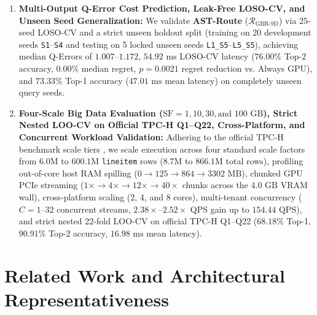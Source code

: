 \documentclass[10pt,a4paper]{article}
\begin{document}
\begin{enumerate}[leftmargin=1.5em,itemsep=2pt]
    \item \textbf{Multi-Output Q-Error Cost Prediction, Leak-Free LOSO-CV, and Unseen Seed Generalization:} We validate \textbf{AST-Route} ($\mathcal{R}_{\text{GBR-9D}}$) via 25-seed LOSO-CV and a strict unseen holdout split (training on 20 development seeds \texttt{S1}--\texttt{S4} and testing on 5 locked unseen seeds \texttt{L1\_S5}--\texttt{L5\_S5}), achieving median Q-Errors of $1.007\text{--}1.172$, $54.92\text{ ms}$ LOSO-CV latency ($76.00\%$ Top-2 accuracy, $0.00\%$ median regret, $p=0.0021$ regret reduction vs. Always GPU), and $73.33\%$ Top-1 accuracy ($47.01\text{ ms}$ mean latency) on completely unseen query seeds.
    \item \textbf{Four-Scale Big Data Evaluation ($\text{SF}=1, 10, 30, \text{and } 100\text{ GB}$), Strict Nested LOO-CV on Official TPC-H Q1--Q22, Cross-Platform, and Concurrent Workload Validation:} Adhering to the official TPC-H benchmark scale tiers \cite{tpc2022tpch,dreseler2020quantifying}, we scale execution across four standard scale factors from $6.0\text{M}$ to $600.1\text{M}$ \texttt{lineitem} rows ($8.7\text{M}$ to $866.1\text{M}$ total rows), profiling out-of-core host RAM spilling ($0 \rightarrow 125 \rightarrow 864 \rightarrow 3302\text{ MB}$), chunked GPU PCIe streaming ($1\times \rightarrow 4\times \rightarrow 12\times \rightarrow 40\times$ chunks across the $4.0\text{ GB}$ VRAM wall), cross-platform scaling (2, 4, and 8 cores), multi-tenant concurrency ($C=1\text{--}32$ concurrent streams, $2.38\times\text{--}2.52\times$ QPS gain up to $154.44\text{ QPS}$), and strict nested 22-fold LOO-CV on official TPC-H Q1--Q22 ($68.18\%$ Top-1, $90.91\%$ Top-2 accuracy, $16.98\text{ ms}$ mean latency).
\end{enumerate}

\section{Related Work and Architectural Representativeness}
\end{document}
